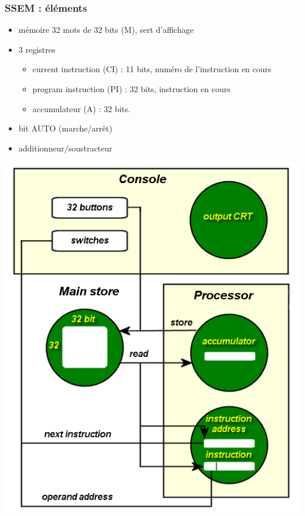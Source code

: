 \documentclass{beamer}
\begin{document}
\begin{frame}
\frametitle{SSEM : éléments}
\begin{multicols}{2}
\begin{itemize}
\item mémoire 32 mots de 32 bits (M), sert d'affichage
\item 3 registres 
\begin{itemize}
\item \alert{current instruction} (CI) : 11 bits, numéro de l'instruction en cours
\item \alert{program instruction} (PI) : 32 bits, instruction en cours
\item \alert{accumulateur} (A) : 32 bits.
\end{itemize}
\item bit AUTO (marche/arrêt)
\item additionneur/soustracteur
\end{itemize}
\begin{center}
\includegraphics[width=\linewidth]{Historique/BabyArchitecture.png}
\end{center}

\end{multicols}
\end{frame}
\end{document}
